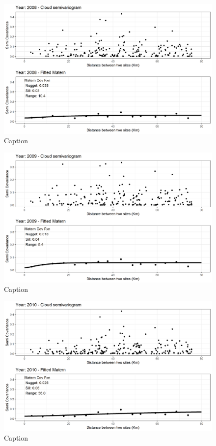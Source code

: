 \begin{figure}
    \centering
    \includegraphics{Figures/EmpiricalVariograms/Empirical_Variogram_2008.png}
    \caption{Caption}
    \label{fig:my_label}
\end{figure}

\begin{figure}
    \centering
    \includegraphics{Figures/EmpiricalVariograms/Empirical_Variogram_2009.png}
    \caption{Caption}
    \label{fig:my_label}
\end{figure}

\begin{figure}
    \centering
    \includegraphics{Figures/EmpiricalVariograms/Empirical_Variogram_2010.png}
    \caption{Caption}
    \label{fig:my_label}
\end{figure}

